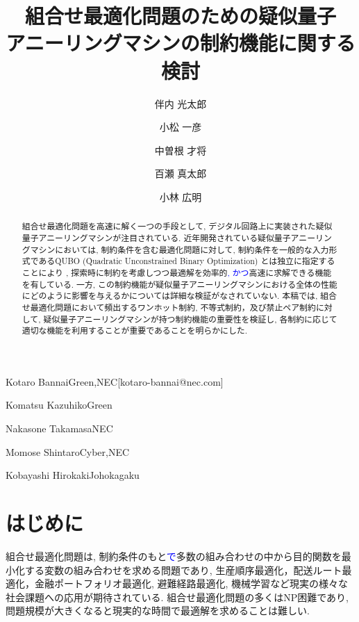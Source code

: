 \documentclass[submit,techrep,noauthor]{ipsj}
\begin{document}
\title{組合せ最適化問題のための疑似量子\\アニーリングマシンの制約機能に関する検討}


\author{伴内 光太郎}{Kotaro Bannai}{Green,NEC}[kotaro-bannai@nec.com]
\author{小松 一彦}{Komatsu Kazuhiko}{Green}
\author{中曽根 才将}{Nakasone Takamasa}{NEC}
\author{百瀬 真太郎}{Momose Shintaro}{Cyber,NEC}
\author{小林 広明}{Kobayashi Hirokaki}{Johokagaku}

\begin{abstract}
組合せ最適化問題を高速に解く一つの手段として, デジタル回路上に実装された疑似量子アニーリングマシンが注目されている. 近年開発されている疑似量子アニーリングマシンにおいては, 制約条件を含む最適化問題に対して, 制約条件を一般的な入力形式であるQUBO (Quadratic Unconstrained Binary Optimization) とは独立に指定することにより
, 探索時に制約を考慮しつつ最適解を効率的\textcolor{blue}{, かつ}高速に求解できる機能を有している. 一方, この制約機能が疑似量子アニーリングマシンにおける全体の性能にどのように影響を与えるかについては詳細な検証がなされていない. 本稿では, 組合せ最適化問題において頻出するワンホット制約, 不等式制約，及び禁止ペア制約に対して, 疑似量子アニーリングマシンが持つ制約機能の重要性を検証し, 各制約に応じて適切な機能を利用することが重要であることを明らかにした.
\end{abstract}

\maketitle

\section{はじめに}
組合せ最適化問題は, 制約条件のもと\textcolor{blue}{で}多数の組み合わせの中から目的関数を最小化する変数の組み合わせを求める問題であり, 生産順序最適化\cite{jobshop}，配送ルート最適化\cite{isc-onoda}，金融ポートフォリオ最適化\cite{portfolio}, 避難経路最適化\cite{tsunami}, 機械学習\cite{ml}など現実の様々な社会課題への応用が期待されている. 組合せ最適化問題の多くはNP困難であり, 問題規模が大きくなると現実的な時間で最適解を求めることは難しい. 
\end{document}
